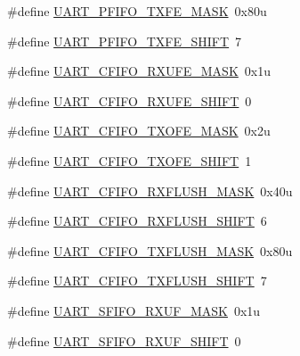 \begin{DoxyCompactItemize}
\item 
\#define \hyperlink{group___u_a_r_t___register___masks_gabd2ffab4f7a98fcfc64dcd37db1b289b}{U\+A\+R\+T\+\_\+\+P\+F\+I\+F\+O\+\_\+\+T\+X\+F\+E\+\_\+\+M\+A\+SK}~0x80u
\item 
\#define \hyperlink{group___u_a_r_t___register___masks_gaf418bafa3c46ece2f82d0c831e8aea47}{U\+A\+R\+T\+\_\+\+P\+F\+I\+F\+O\+\_\+\+T\+X\+F\+E\+\_\+\+S\+H\+I\+FT}~7
\item 
\#define \hyperlink{group___u_a_r_t___register___masks_ga42bfb17cbfc685358f621e71f35225af}{U\+A\+R\+T\+\_\+\+C\+F\+I\+F\+O\+\_\+\+R\+X\+U\+F\+E\+\_\+\+M\+A\+SK}~0x1u
\item 
\#define \hyperlink{group___u_a_r_t___register___masks_ga9d089a8ed91922d0da34a362a29a2bd5}{U\+A\+R\+T\+\_\+\+C\+F\+I\+F\+O\+\_\+\+R\+X\+U\+F\+E\+\_\+\+S\+H\+I\+FT}~0
\item 
\#define \hyperlink{group___u_a_r_t___register___masks_gac0d4e861e21453eecfc55ae37c97262d}{U\+A\+R\+T\+\_\+\+C\+F\+I\+F\+O\+\_\+\+T\+X\+O\+F\+E\+\_\+\+M\+A\+SK}~0x2u
\item 
\#define \hyperlink{group___u_a_r_t___register___masks_ga10885c0219ee82009a9041c1018e205c}{U\+A\+R\+T\+\_\+\+C\+F\+I\+F\+O\+\_\+\+T\+X\+O\+F\+E\+\_\+\+S\+H\+I\+FT}~1
\item 
\#define \hyperlink{group___u_a_r_t___register___masks_ga220d54d00fd7f64a3c31a9b593e4ffed}{U\+A\+R\+T\+\_\+\+C\+F\+I\+F\+O\+\_\+\+R\+X\+F\+L\+U\+S\+H\+\_\+\+M\+A\+SK}~0x40u
\item 
\#define \hyperlink{group___u_a_r_t___register___masks_gaa2254c7b026117f42b36539b526aca46}{U\+A\+R\+T\+\_\+\+C\+F\+I\+F\+O\+\_\+\+R\+X\+F\+L\+U\+S\+H\+\_\+\+S\+H\+I\+FT}~6
\item 
\#define \hyperlink{group___u_a_r_t___register___masks_ga026f6169c18280c4dd4fb93d5b3bf400}{U\+A\+R\+T\+\_\+\+C\+F\+I\+F\+O\+\_\+\+T\+X\+F\+L\+U\+S\+H\+\_\+\+M\+A\+SK}~0x80u
\item 
\#define \hyperlink{group___u_a_r_t___register___masks_gaebc78a602339988f0960140aeeca4d93}{U\+A\+R\+T\+\_\+\+C\+F\+I\+F\+O\+\_\+\+T\+X\+F\+L\+U\+S\+H\+\_\+\+S\+H\+I\+FT}~7
\item 
\#define \hyperlink{group___u_a_r_t___register___masks_ga05a2524e2dabd91dddf527a472744bab}{U\+A\+R\+T\+\_\+\+S\+F\+I\+F\+O\+\_\+\+R\+X\+U\+F\+\_\+\+M\+A\+SK}~0x1u
\item 
\#define \hyperlink{group___u_a_r_t___register___masks_ga6c82c75944a1162ef6db65575b3e9c0d}{U\+A\+R\+T\+\_\+\+S\+F\+I\+F\+O\+\_\+\+R\+X\+U\+F\+\_\+\+S\+H\+I\+FT}~0
\item 

\end{DoxyCompactItemize}
